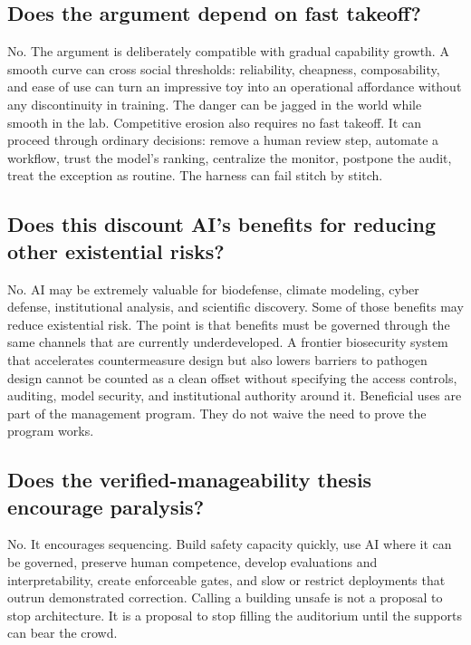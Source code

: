\documentclass[11pt]{article}
\begin{document}
\subsection{Does the argument depend on fast takeoff?}

No. The argument is deliberately compatible with gradual capability growth. A smooth curve can cross social thresholds: reliability, cheapness, composability, and ease of use can turn an impressive toy into an operational affordance without any discontinuity in training. The danger can be jagged in the world while smooth in the lab. Competitive erosion also requires no fast takeoff. It can proceed through ordinary decisions: remove a human review step, automate a workflow, trust the model's ranking, centralize the monitor, postpone the audit, treat the exception as routine. The harness can fail stitch by stitch.

\subsection{Does this discount AI's benefits for reducing other existential risks?}

No. AI may be extremely valuable for biodefense, climate modeling, cyber defense, institutional analysis, and scientific discovery. Some of those benefits may reduce existential risk. The point is that benefits must be governed through the same channels that are currently underdeveloped. A frontier biosecurity system that accelerates countermeasure design but also lowers barriers to pathogen design cannot be counted as a clean offset without specifying the access controls, auditing, model security, and institutional authority around it. Beneficial uses are part of the management program. They do not waive the need to prove the program works.

\subsection{Does the verified-manageability thesis encourage paralysis?}

No. It encourages sequencing. Build safety capacity quickly, use AI where it can be governed, preserve human competence, develop evaluations and interpretability, create enforceable gates, and slow or restrict deployments that outrun demonstrated correction. Calling a building unsafe is not a proposal to stop architecture. It is a proposal to stop filling the auditorium until the supports can bear the crowd.
\end{document}
